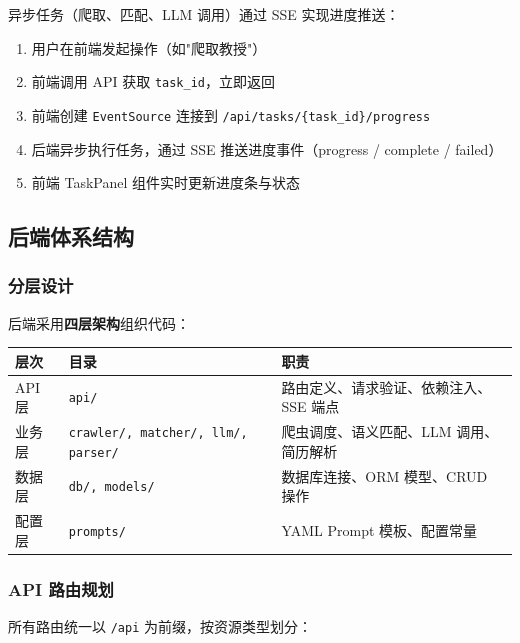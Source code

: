 \documentclass[11pt]{article}
\begin{document}
异步任务（爬取、匹配、LLM 调用）通过 SSE 实现进度推送：

\begin{enumerate}
    \item 用户在前端发起操作（如"爬取教授"）
    \item 前端调用 API 获取 \texttt{task\_id}，立即返回
    \item 前端创建 \texttt{EventSource} 连接到 \texttt{/api/tasks/\{task\_id\}/progress}
    \item 后端异步执行任务，通过 SSE 推送进度事件（progress / complete / failed）
    \item 前端 TaskPanel 组件实时更新进度条与状态
\end{enumerate}

\subsection{后端体系结构}

\subsubsection{分层设计}

后端采用\textbf{四层架构}组织代码：

\begin{center}
\small
\begin{tabular}{lp{4.5cm}p{4cm}}
\toprule
\textbf{层次} & \textbf{目录} & \textbf{职责} \\
\midrule
API 层 & \texttt{api/} & 路由定义、请求验证、依赖注入、SSE 端点 \\
业务层 & \texttt{crawler/, matcher/, llm/, parser/} & 爬虫调度、语义匹配、LLM 调用、简历解析 \\
数据层 & \texttt{db/, models/} & 数据库连接、ORM 模型、CRUD 操作 \\
配置层 & \texttt{prompts/} & YAML Prompt 模板、配置常量 \\
\bottomrule
\end{tabular}
\end{center}

\subsubsection{API 路由规划}

所有路由统一以 \texttt{/api} 为前缀，按资源类型划分：
\end{document}
